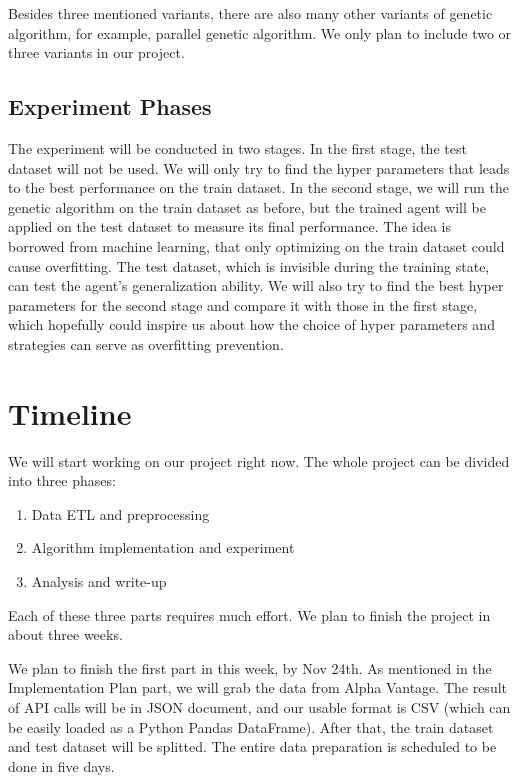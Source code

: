 \documentclass{article}
\begin{document}
Besides three mentioned variants, there are also many other variants of genetic algorithm, for example, parallel genetic algorithm. \cite{sizing-populations-for-serial-and-parallel-genetic-algorithms}
We only plan to include two or three variants in our project.

\subsection{Experiment Phases}

The experiment will be conducted in two stages.
In the first stage, the test dataset will not be used.
We will only try to find the hyper parameters that leads to the best performance on the train dataset.
In the second stage, we will run the genetic algorithm on the train dataset as before,
but the trained agent will be applied on the test dataset to measure its final performance.
The idea is borrowed from machine learning, that only optimizing on the train dataset could cause overfitting.
The test dataset, which is invisible during the training state, can test the agent's generalization ability.
We will also try to find the best hyper parameters for the second stage and compare it with those in the first stage,
which hopefully could inspire us about how the choice of hyper parameters and strategies can serve as overfitting prevention.


\section{Timeline}

We will start working on our project right now.
The whole project can be divided into three phases:
\begin{enumerate}
	\item Data ETL and preprocessing
	\item Algorithm implementation and experiment
	\item Analysis and write-up
\end{enumerate}

Each of these three parts requires much effort.
We plan to finish the project in about three weeks.

We plan to finish the first part in this week, by Nov 24th.
As mentioned in the Implementation Plan part, we will grab the data from Alpha Vantage.
The result of API calls will be in JSON document, and our usable format is CSV
(which can be easily loaded as a Python Pandas DataFrame).
After that, the train dataset and test dataset will be splitted.
The entire data preparation is scheduled to be done in five days.
\end{document}
